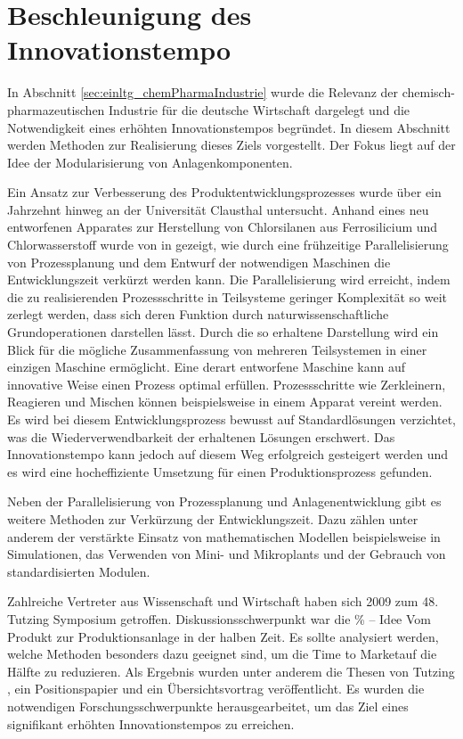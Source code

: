 \section{Beschleunigung des Innovationstempo}\label{sec:einltg_beschlngInnovationstempo}
In Abschnitt \ref{sec:einltg_chemPharmaIndustrie} wurde die Relevanz der chemisch-pharmazeutischen Industrie f\"ur die deutsche Wirtschaft dargelegt und die Notwendigkeit eines erh\"ohten Innovationstempos begr\"undet. In diesem Abschnitt werden Methoden zur Realisierung dieses Ziels vorgestellt. Der Fokus liegt auf der Idee der Modularisierung von Anlagenkomponenten.

Ein Ansatz zur Verbesserung des Produktentwicklungsprozesses wurde \"uber ein Jahrzehnt hinweg an der Universit\"at Clausthal untersucht. Anhand eines neu entworfenen Apparates zur Herstellung von Chlorsilanen aus Ferrosilicium und Chlorwasserstoff wurde von \citeauthor{Dietz_2000} in \cite{Dietz_2000} gezeigt, wie durch eine fr\"uhzeitige Parallelisierung von Prozessplanung und dem Entwurf der notwendigen Maschinen die Entwicklungszeit verk\"urzt werden kann. Die Parallelisierung wird erreicht, indem die zu realisierenden Prozessschritte in Teilsysteme geringer Komplexit\"at so weit zerlegt werden, dass sich deren Funktion durch naturwissenschaftliche Grundoperationen darstellen l\"asst. Durch die so erhaltene Darstellung wird ein Blick f\"ur die m\"ogliche Zusammenfassung von mehreren Teilsystemen in einer einzigen Maschine erm\"oglicht. Eine derart entworfene Maschine kann auf innovative Weise einen Prozess optimal erf\"ullen. Prozessschritte wie Zerkleinern, Reagieren und Mischen k\"onnen beispielsweise in einem Apparat vereint werden. Es wird bei diesem Entwicklungsprozess bewusst auf Standardl\"osungen verzichtet, was die Wiederverwendbarkeit der erhaltenen L\"osungen  erschwert. Das Innovationstempo kann jedoch auf diesem Weg erfolgreich gesteigert werden und es wird eine hocheffiziente Umsetzung f\"ur einen  Produktionsprozess gefunden. 

Neben der Parallelisierung von Prozessplanung und Anlagenentwicklung gibt es weitere Methoden zur Verk\"urzung der Entwicklungszeit. Dazu z\"ahlen unter anderem der verst\"arkte Einsatz von mathematischen Modellen beispielsweise in Simulationen, das Verwenden von Mini- und Mikroplants und der Gebrauch von standardisierten Modulen.


Zahlreiche Vertreter aus Wissenschaft und Wirtschaft haben sich 2009 zum 48. Tutzing Symposium getroffen. Diskussionsschwerpunkt war die \% -- Idee Vom Produkt zur Produktionsanlage in der halben Zeit\grqq { }. Es sollte analysiert werden, welche Methoden besonders dazu geeignet sind, um die \glqq Time to Market\grqq { }auf die H\"alfte zu reduzieren. Als Ergebnis wurden unter anderem die Thesen von Tutzing \cite{Processnet_2009}, ein Positionspapier \cite{Processnet_2010} und ein \"Ubersichtsvortrag \cite{Schembecker_2009} ver\"offentlicht. Es wurden die notwendigen Forschungsschwerpunkte herausgearbeitet, um das Ziel eines signifikant erh\"ohten Innovationstempos zu erreichen.

